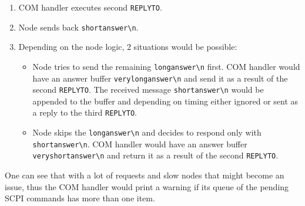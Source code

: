 \begin{itemize}
{\begin{enumerate}
			\item COM handler executes second \texttt{REPLYTO}.
			\item Node sends back \texttt{shortanswer\textbackslash n}.
			\item Depending on the node logic, 2 situations would be possible:
			\begin{itemize}
				\item Node tries to send the remaining \texttt{longanswer\textbackslash n} first. COM handler would have an answer buffer \texttt{verylonganswer\textbackslash n} and send it as a result of the second \texttt{REPLYTO}. The received message \texttt{shortanswer\textbackslash n} would be appended to the buffer and depending on timing either ignored or sent as a reply to the third \texttt{REPLYTO}.
				\item Node skips the \texttt{longanswer\textbackslash n} and decides to respond only with \texttt{shortanswer\textbackslash n}. COM handler would have an answer buffer \texttt{veryshortanswer\textbackslash n} and return it as a result of the second \texttt{REPLYTO}.
			\end{itemize}
		\end{enumerate}
		One can see that with a lot of requests and slow nodes that might become an issue, thus the COM handler would print a warning if its queue of the pending SCPI commands has more than one item.
	}
\end{itemize}